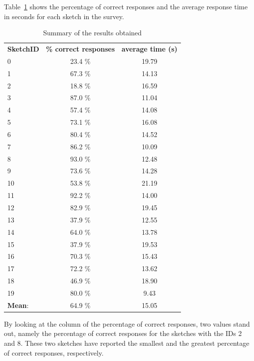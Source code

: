 
   

\noindent Table~\ref{tab:responses summary} shows the percentage of correct responses and the average response time in seconds for each sketch in the survey.
\begin{table}[!ht]
\begin{center}
    \begin{tabular}{lcc}
    \textbf{SketchID} & \textbf{\% correct responses} & \textbf{average time (s)} \\
    0 & 23.4 \%  & 19.79 \\
    1 & 67.3 \%  & 14.13 \\
    2 & 18.8 \%  & 16.59\\
    3 & 87.0 \%  & 11.04 \\
    4 & 57.4 \%  & 14.08 \\
    5 & 73.1 \%  & 16.08 \\
    6 & 80.4 \%  & 14.52 \\
    7 & 86.2 \%  & 10.09 \\
    8 & 93.0 \%  & 12.48 \\
    9 & 73.6 \%  & 14.28 \\
    10 & 53.8 \%  & 21.19 \\
    11 & 92.2 \%  & 14.00 \\
    12 & 82.9 \%  & 19.45 \\
    13 & 37.9 \%  & 12.55 \\
    14 & 64.0 \%  & 13.78 \\
    15 & 37.9 \%  & 19.53 \\
    16 & 70.3 \%  & 15.43 \\
    17 & 72.2 \%  & 13.62 \\
    18 & 46.9 \%  & 18.90 \\
    19 & 80.0 \%  & 9.43 \\
    \hline
    \hline
    \textbf{Mean}: & 64.9 \% & 15.05
    \end{tabular}
     \caption{\label{tab:responses summary}Summary of the results obtained}
\end{center}
\end{table}
%
By looking at the column of the percentage of correct responses, two values stand out, namely the percentage of correct responses for the sketches with the IDs \num{2} and \num{8}. These two sketches have reported the smallest and the greatest percentage of correct responses, respectively.

